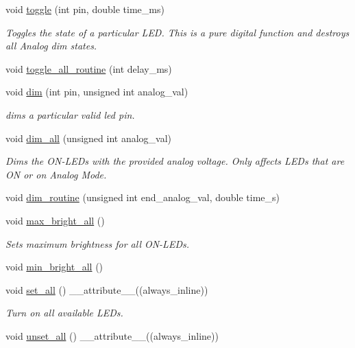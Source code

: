 \begin{DoxyCompactItemize}
void \hyperlink{classLEDSet_a08727d959328a2ecbab6c1e8c6ce4ada}{toggle} (int pin, double time\+\_\+ms)
\begin{DoxyCompactList}\small\item\em Toggles the state of a particular L\+ED. This is a pure digital function and destroys all Analog dim states. \end{DoxyCompactList}\item 
void \hyperlink{classLEDSet_a61cc024950a5b66dff34c449cc73787f}{toggle\+\_\+all\+\_\+routine} (int delay\+\_\+ms)
\item 
void \hyperlink{classLEDSet_a8a5ef40584236c3793e4274688eac379}{dim} (int pin, unsigned int analog\+\_\+val)
\begin{DoxyCompactList}\small\item\em dims a particular valid led pin. \end{DoxyCompactList}\item 
void \hyperlink{classLEDSet_ad8313aa0c4fc34cd3481db0fade6318c}{dim\+\_\+all} (unsigned int analog\+\_\+val)
\begin{DoxyCompactList}\small\item\em Dims the O\+N-\/\+L\+E\+Ds with the provided analog voltage. Only affects L\+E\+Ds that are ON or on Analog Mode. \end{DoxyCompactList}\item 
void \hyperlink{classLEDSet_a02a191f4c6755092ffe30cca34922734}{dim\+\_\+routine} (unsigned int end\+\_\+analog\+\_\+val, double time\+\_\+s)
\item 
void \hyperlink{classLEDSet_a73dae073882d369a9cc9b9a93f446157}{max\+\_\+bright\+\_\+all} ()
\begin{DoxyCompactList}\small\item\em Sets maximum brightness for all O\+N-\/\+L\+E\+Ds. \end{DoxyCompactList}\item 
void \hyperlink{classLEDSet_a9479e36e91b5b1387cfc27722a4a6007}{min\+\_\+bright\+\_\+all} ()
\item 
void \hyperlink{classLEDSet_aaebfea59ba933621c4f7d7d405119702}{set\+\_\+all} () \+\_\+\+\_\+attribute\+\_\+\+\_\+((always\+\_\+inline))
\begin{DoxyCompactList}\small\item\em Turn on all available L\+E\+Ds. \end{DoxyCompactList}\item 
void \hyperlink{classLEDSet_aabff2609d8df733936dda53d60302b72}{unset\+\_\+all} () \+\_\+\+\_\+attribute\+\_\+\+\_\+((always\+\_\+inline))

\end{DoxyCompactItemize}
